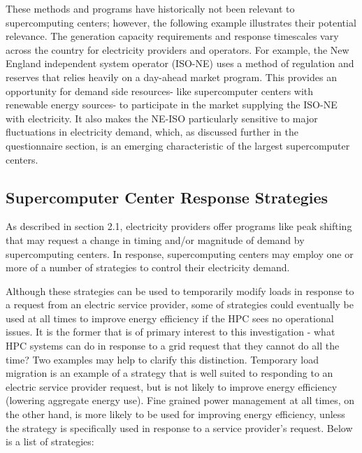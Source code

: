These methods and programs have historically not been relevant to supercomputing centers; however, 
the following example illustrates their potential relevance.
The generation capacity requirements and response timescales vary across the country for electricity 
providers and operators. For example, the New England independent system operator (ISO-NE) uses a method 
of regulation and reserves that relies heavily on a day-ahead market program. This provides an opportunity 
for demand side resources- like supercomputer centers with renewable energy sources- to participate in the 
market supplying the ISO-NE with electricity.  It also makes the NE-ISO particularly sensitive to major 
fluctuations in electricity demand, which, as discussed further in the questionnaire section, is an emerging 
characteristic of the largest supercomputer centers.

\subsection{Supercomputer Center Response Strategies}

As described in section 2.1, electricity providers offer programs like peak shifting that may request 
a change in timing and/or magnitude of demand by supercomputing centers.  
In response, supercomputing centers may employ one or more of a number of strategies to control their 
electricity demand.

Although these strategies can be used to temporarily modify loads in response to a request from an 
electric service provider, some of strategies could eventually be used at all times to improve energy 
efficiency if the HPC sees no operational issues. It is the former that is of primary interest to this 
investigation - what HPC systems can do in response to a grid request that they cannot do all the time? 
Two examples may help to clarify this distinction. Temporary load migration is an example of a strategy 
that is well suited to responding to an electric service provider request, but is not likely to improve 
energy efficiency (lowering aggregate energy use). Fine grained power management at all times, on 
the other hand, is more likely to be used for improving energy efficiency, unless the strategy is 
specifically used in response to a service provider's request. 
Below is a list of strategies:

